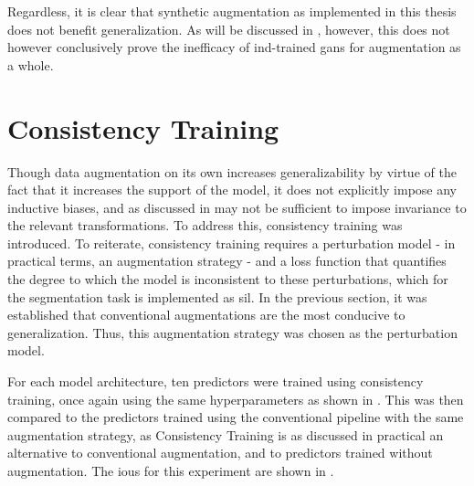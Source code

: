 Regardless, it is clear that synthetic augmentation as implemented in this thesis does not benefit generalization. As will be discussed in , however, this does not however conclusively prove the inefficacy of \gls{ind}-trained \glspl{gan} for augmentation as a whole. 


\section{Consistency Training}\label{consistency_training}
Though data augmentation on its own increases generalizability by virtue of the fact that it increases the support of the model, it does not explicitly impose any inductive biases, and as discussed in  may not be sufficient to impose invariance to the relevant transformations. To address this, consistency training was introduced. To reiterate, consistency training requires a perturbation model - in practical terms, an augmentation strategy - and a loss function that quantifies the degree to which the model is inconsistent to these perturbations, which for the segmentation task is implemented as \gls{sil}. In the previous section, it was established that conventional augmentations are the most conducive to generalization. Thus, this augmentation strategy was chosen as the perturbation model. 

For each model architecture, ten predictors were trained using consistency training, once again using the same hyperparameters as shown in . This was then compared to the predictors trained using the conventional pipeline with the same augmentation strategy, as Consistency Training is as discussed in practical an alternative to conventional augmentation, and to predictors trained without augmentation. The \glspl{iou} for this experiment are shown in .

